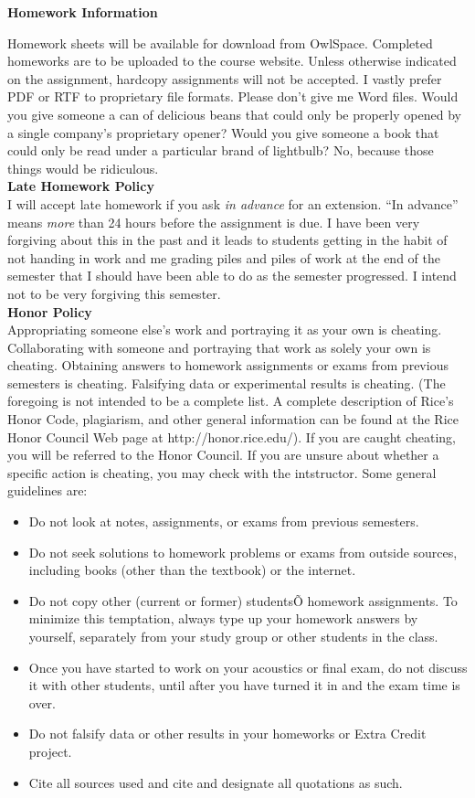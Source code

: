 \documentclass [11pt]{article}
\begin{document}
{\bf Homework Information}

Homework sheets will be available for download from OwlSpace.  Completed homeworks are to be uploaded to the course website.  Unless otherwise indicated on the assignment, hardcopy assignments will not be accepted.  I vastly prefer PDF or RTF to proprietary file formats.  Please don't give me Word files.  Would you give someone a can of delicious beans that could only be properly opened by a single company's proprietary opener?  Would you give someone a book that could only be read under a particular brand of lightbulb?  No, because those things would be ridiculous. \\

{\bf Late Homework Policy}\\
I will accept late homework if you ask \emph{in advance} for an extension.  ``In advance'' means \emph{more} than 24 hours before the assignment is due.  I have been very forgiving about this in the past and it leads to students getting in the habit of not handing in work and me grading piles and piles of work at the end of the semester that I should have been able to do as the semester progressed.  I intend not to be very forgiving this semester.\\

{\bf Honor Policy}\\
Appropriating someone else's work and portraying it as your own is cheating.  Collaborating with someone and portraying that work as solely your own is cheating.  Obtaining answers to homework assignments or exams from previous semesters is cheating. Falsifying data or experimental results is cheating. (The foregoing is not intended to be a complete list. A complete description of Rice's Honor Code, plagiarism, and other general information can be found at the Rice Honor Council Web page at http://honor.rice.edu/).  If you are caught cheating, you will be referred to the Honor Council.  If you are unsure about whether a specific action is cheating, you may check with the intstructor.  Some general guidelines are:\\

\begin{itemize}
     \item Do not look at notes, assignments, or exams from previous semesters.
     \item Do not seek solutions to homework problems or exams from outside sources, including books (other than the textbook) or the internet.
     \item Do not copy other (current or former) studentsÕ homework assignments. To minimize this temptation, always type up your homework answers by yourself, separately from your study group or other students in the class.
     \item Once you have started to work on your acoustics or final exam, do not discuss it with other students, until after you have turned it in and the exam time is over.
     \item Do not falsify data or other results in your homeworks or Extra Credit project.
     \item Cite all sources used and cite and designate all quotations as such.
\end{itemize}
\end{document}
